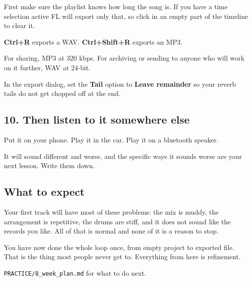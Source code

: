 First make sure the playlist knows how long the song is. If you have a time selection active
FL will export only that, so click in an empty part of the timeline to clear it.

\textbf{Ctrl+R} exports a WAV. \textbf{Ctrl+Shift+R} exports an MP3.

For sharing, MP3 at 320 kbps. For archiving or sending to anyone who will work on it further,
WAV at 24-bit.

In the export dialog, set the \textbf{Tail} option to \textbf{Leave remainder} so your reverb tails do
not get chopped off at the end.

\subsection{10. Then listen to it somewhere else}\label{fl03_first_track-10-then-listen-to-it-somewhere-else}

Put it on your phone. Play it in the car. Play it on a bluetooth speaker.

It will sound different and worse, and the specific ways it sounds worse are your next
lesson. Write them down.

\subsection{What to expect}\label{fl03_first_track-what-to-expect}

Your first track will have most of these problems: the mix is muddy, the arrangement is
repetitive, the drums are stiff, and it does not sound like the records you like. All of that
is normal and none of it is a reason to stop.

You have now done the whole loop once, from empty project to exported file. That is the thing
most people never get to. Everything from here is refinement.

\texttt{PRACTICE/8\_week\_plan.md} for what to do next.
